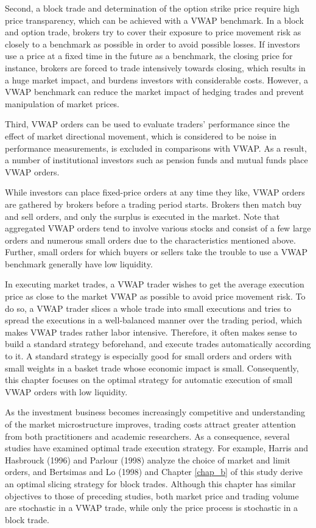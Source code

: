 Second, a block trade and determination of the option strike price require high price transparency, which can be achieved with a VWAP benchmark.  In a block and option trade, brokers try to cover their exposure to price movement risk as closely to a benchmark as possible in order to avoid possible losses.  If investors use a price at a fixed time in the future as a benchmark, the closing price for instance, brokers are forced to trade intensively towards closing, which results in a huge market impact, and burdens investors with considerable costs.  However, a VWAP benchmark can reduce the market impact of hedging trades and prevent manipulation of market prices.  

Third, VWAP orders can be used to evaluate traders' performance since the effect of market directional movement, which is considered to be noise in performance measurements, is excluded in comparisons with VWAP.  As a result, a number of institutional investors such as pension funds and mutual funds place VWAP orders. 

While investors can place fixed-price orders at any time they like, VWAP orders are gathered by brokers before a trading period starts.  Brokers then match buy and sell orders, and only the surplus is executed in the market.  Note that aggregated VWAP orders tend to involve various stocks and consist of a few large orders and numerous small orders due to the characteristics mentioned above.  Further, small orders for which buyers or sellers take the trouble to use a VWAP benchmark generally have low liquidity.

In executing market trades, a VWAP trader wishes to get the average execution price as close to the market VWAP as possible to avoid price movement risk.  To do so, a VWAP trader slices a whole trade into small executions and tries to spread the executions in a well-balanced manner over the trading period, which makes VWAP trades rather labor intensive.  Therefore, it often makes sense to build a standard strategy beforehand, and execute trades automatically according to it.  A standard strategy is especially good for small orders and orders with small weights in a basket trade whose economic impact is small.  Consequently, this chapter focuses on the optimal strategy for automatic execution of small VWAP orders with low liquidity.  

As the investment business becomes increasingly competitive and understanding of the market microstructure improves, trading costs attract greater attention from both practitioners and academic researchers.  As a consequence, several studies have examined optimal trade execution strategy.  For example, Harris and Hasbrouck (1996) and Parlour (1998) analyze the choice of market and limit orders, and Bertsimas and Lo (1998) and Chapter \ref{chap_b} of this study derive an optimal slicing strategy for block trades.  Although this chapter has similar objectives to those of preceding studies, both market price and trading volume are stochastic in a VWAP trade, while only the price process is stochastic in a block trade.


